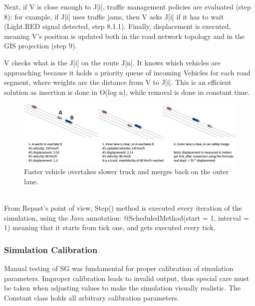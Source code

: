 \documentclass[11pt]{article}
\begin{document}
Next, if V is close enough to J[i], traffic management policies are evaluated (step 8): for example, if J[i] uses traffic jams, then V asks J[i] if it has to wait (Light.RED signal detected, step 8.1.1). Finally, displacement is executed, meaning V\textquoteright s position is updated both in the road network topology and in the GIS projection (step 9).

V checks what is the J[i] on the route J[n]. It knows which vehicles are approaching because it holds a priority queue of incoming Vehicles for each road segment, where weights are the distance from V to J[i]. This is an efficient solution as insertion is done in O(log n), while removal is done in constant time.
\\

\begin{figure}[H]
\begin{center}
\includegraphics[scale=0.4]{overtaking}
\caption{Faster vehicle overtakes slower truck and merges back on the outer lane.}
\end{center}
\end{figure}

\\
From Repast\textquoteright s point of view, Step() method is executed every iteration of the simulation, using the Java annotation: @ScheduledMethod(start = 1, interval = 1) meaning that it starts from tick one, and gets executed every tick.


\subsubsection{Simulation Calibration}

Manual testing of SG was fundamental for proper calibration of simulation parameters.
Improper calibration leads to invalid output, thus special care must be taken when adjusting values to make the simulation visually realistic. The Constant class holds all arbitrary calibration parameters.
\end{document}
